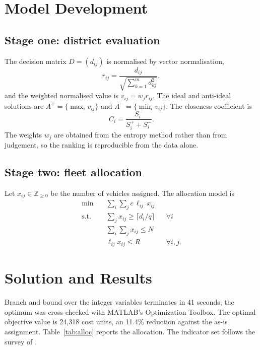 \documentclass[12pt]{article}
\begin{document}
\section{Model Development}

\subsection{Stage one: district evaluation}

The decision matrix $D=(d_{ij})$ is normalised by vector normalisation,
\begin{equation}
  r_{ij} = \frac{d_{ij}}{\sqrt{\sum_{k=1}^{m} d_{kj}^2}},
\end{equation}
and the weighted normalised value is $v_{ij} = w_j r_{ij}$. The ideal and
anti-ideal solutions are $A^{+} = \{\max_i v_{ij}\}$ and
$A^{-} = \{\min_i v_{ij}\}$. The closeness coefficient is
\begin{equation}
  C_i = \frac{S_i^{-}}{S_i^{+} + S_i^{-}} .
\end{equation}
The weights $w_j$ are obtained from the entropy method rather than from judgement,
so the ranking is reproducible from the data alone.

\subsection{Stage two: fleet allocation}

Let $x_{ij} \in \mathbb{Z}_{\ge 0}$ be the number of vehicles assigned. The
allocation model is
\begin{align}
  \min \quad & \sum_{i}\sum_{j} c \, \ell_{ij} \, x_{ij} \\
  \text{s.t.} \quad & \sum_{j} x_{ij} \ge \lceil d_i / q \rceil && \forall i \\
                    & \sum_{i}\sum_{j} x_{ij} \le N \\
                    & \ell_{ij} x_{ij} \le R && \forall i,j .
\end{align}

\section{Solution and Results}

Branch and bound over the integer variables terminates in 41 seconds; the optimum
was cross-checked with MATLAB's Optimization Toolbox.\cite{matlab} The optimal
objective value is 24{,}318 cost units, an 11.4\% reduction against the
as-is assignment. Table~\ref{tab:alloc} reports the allocation. The indicator set
follows the survey of \cite{cheng2019}.
\end{document}
